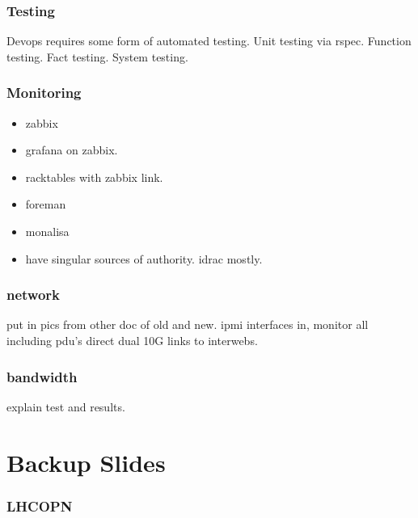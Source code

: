 \documentclass{beamer}
\begin{document}
\begin{frame}
  \frametitle{Testing}
  Devops requires some form of automated testing.
  Unit testing via rspec.
  Function testing.
  Fact testing.
  System testing.
\end{frame}

\begin{frame}
  \frametitle{Monitoring}
  \begin{itemize}
    \item zabbix
    \item grafana on zabbix.
    \item racktables with zabbix link.
    \item foreman
    \item monalisa
    \item have singular sources of authority. idrac mostly.
  \end{itemize}
\end{frame}

\begin{frame}
  \frametitle{network}
  put in pics from other doc of old and new.
  ipmi interfaces in, monitor all including pdu's
  direct dual 10G links to interwebs.
\end{frame}

\begin{frame}
  \frametitle{bandwidth}
  explain test and results.
\end{frame}



\section{Backup Slides}

\begin{frame}
  \frametitle{LHCOPN}
\end{frame}
\end{document}
